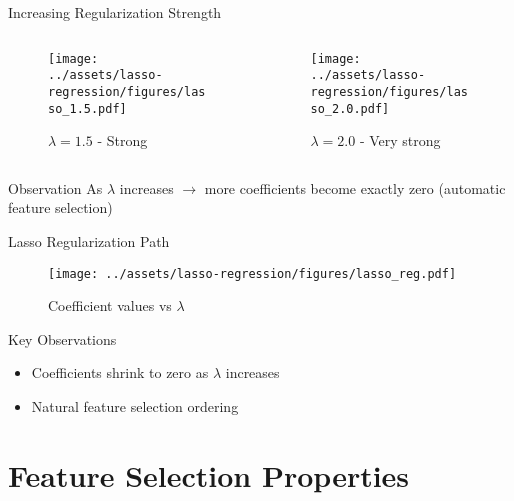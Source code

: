 \documentclass{beamer}
\begin{document}
\begin{frame}{Increasing Regularization Strength}
\begin{columns}
\begin{column}{0.5\textwidth}
\begin{figure}
\texttt{[image: ../assets/lasso-regression/figures/lasso\_1.5.pdf]}
\caption{{\footnotesize $\lambda = 1.5$ - Strong}}
\end{figure}
\end{column}
\begin{column}{0.5\textwidth}
\begin{figure}
\texttt{[image: ../assets/lasso-regression/figures/lasso\_2.0.pdf]}
\caption{{\footnotesize $\lambda = 2.0$ - Very strong}}
\end{figure}
\end{column}
\end{columns}

\begin{keypointsbox}{Observation}
As $\lambda$ increases $\rightarrow$ more coefficients become exactly zero (automatic feature selection)
\end{keypointsbox}
\end{frame}

\begin{frame}{Lasso Regularization Path}
\begin{figure}
    \centering
    \texttt{[image: ../assets/lasso-regression/figures/lasso\_reg.pdf]}
    \caption{{\footnotesize Coefficient values vs $\lambda$}}
    \label{fig:my_label}
\end{figure}

\begin{keypointsbox}{Key Observations}
{\small
\begin{itemize}
\item Coefficients shrink to zero as $\lambda$ increases
\item Natural feature selection ordering
\end{itemize}
}
\end{keypointsbox}
\end{frame}

\section{Feature Selection Properties}
\end{document}
